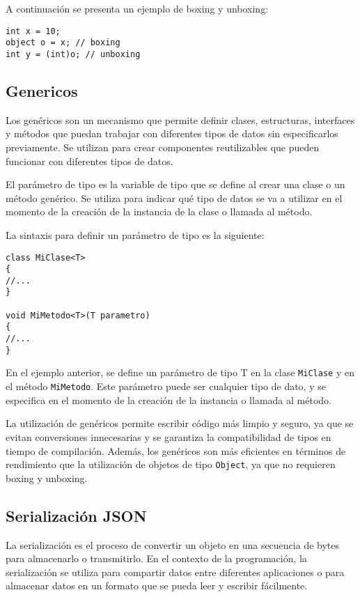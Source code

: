 \documentclass[executivepaper]{article}
\begin{document}
A continuación se presenta un ejemplo de boxing y unboxing:

\begin{lstlisting}
int x = 10;
object o = x; // boxing
int y = (int)o; // unboxing
\end{lstlisting}

\subsection*{Genericos}

Los genéricos son un mecanismo que permite definir clases, estructuras, interfaces y métodos que puedan trabajar con diferentes tipos de datos sin especificarlos previamente. Se utilizan para crear componentes reutilizables que pueden funcionar con diferentes tipos de datos.

El parámetro de tipo es la variable de tipo que se define al crear una clase o un método genérico. Se utiliza para indicar qué tipo de datos se va a utilizar en el momento de la creación de la instancia de la clase o llamada al método.

La sintaxis para definir un parámetro de tipo es la siguiente:

\begin{lstlisting}
class MiClase<T>
{
//...
}

void MiMetodo<T>(T parametro)
{
//...
}
\end{lstlisting}

En el ejemplo anterior, se define un parámetro de tipo T en la clase \texttt{MiClase} y en el método \texttt{MiMetodo}. Este parámetro puede ser cualquier tipo de dato, y se especifica en el momento de la creación de la instancia o llamada al método.

La utilización de genéricos permite escribir código más limpio y seguro, ya que se evitan conversiones innecesarias y se garantiza la compatibilidad de tipos en tiempo de compilación. Además, los genéricos son más eficientes en términos de rendimiento que la utilización de objetos de tipo \texttt{Object}, ya que no requieren boxing y unboxing.

\subsection{Serialización JSON}


La serialización es el proceso de convertir un objeto en una secuencia de bytes para almacenarlo o transmitirlo. En el contexto de la programación, la serialización se utiliza para compartir datos entre diferentes aplicaciones o para almacenar datos en un formato que se pueda leer y escribir fácilmente.
\end{document}
